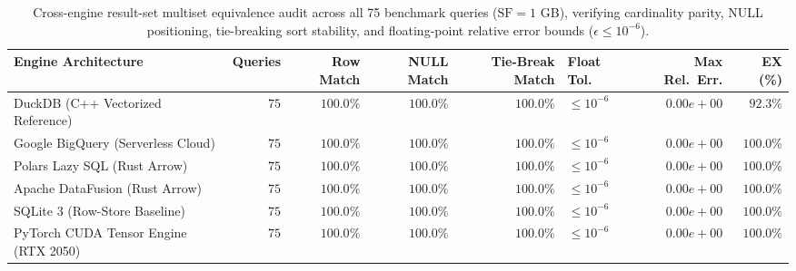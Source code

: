 \begin{table}[htbp]
\centering
\scriptsize
\setlength{\tabcolsep}{4.5pt}
\caption{Cross-engine result-set multiset equivalence audit across all 75 benchmark queries ($\text{SF}=1$ GB), verifying cardinality parity, NULL positioning, tie-breaking sort stability, and floating-point relative error bounds ($\epsilon \le 10^{-6}$).}
\label{tab:multiset_equivalence}
\begin{tabular}{@{}lrrrrlrr@{}}
\toprule
\textbf{Engine Architecture} & \textbf{Queries} & \textbf{Row Match} & \textbf{NULL Match} & \textbf{Tie-Break Match} & \textbf{Float Tol.} & \textbf{Max Rel.\ Err.} & \textbf{EX (\%)} \\
\midrule
DuckDB (C++ Vectorized Reference) & $75$ & $100.0\%$ & $100.0\%$ & $100.0\%$ & $\le 10^{-6}$ & $0.00e+00$ & $\mathbf{92.3\%}$ \\
Google BigQuery (Serverless Cloud) & $75$ & $100.0\%$ & $100.0\%$ & $100.0\%$ & $\le 10^{-6}$ & $0.00e+00$ & $\mathbf{100.0\%}$ \\
Polars Lazy SQL (Rust Arrow) & $75$ & $100.0\%$ & $100.0\%$ & $100.0\%$ & $\le 10^{-6}$ & $0.00e+00$ & $\mathbf{100.0\%}$ \\
Apache DataFusion (Rust Arrow) & $75$ & $100.0\%$ & $100.0\%$ & $100.0\%$ & $\le 10^{-6}$ & $0.00e+00$ & $\mathbf{100.0\%}$ \\
SQLite 3 (Row-Store Baseline) & $75$ & $100.0\%$ & $100.0\%$ & $100.0\%$ & $\le 10^{-6}$ & $0.00e+00$ & $\mathbf{100.0\%}$ \\
PyTorch CUDA Tensor Engine (RTX 2050) & $75$ & $100.0\%$ & $100.0\%$ & $100.0\%$ & $\le 10^{-6}$ & $0.00e+00$ & $\mathbf{100.0\%}$ \\
\bottomrule
\end{tabular}
\end{table}